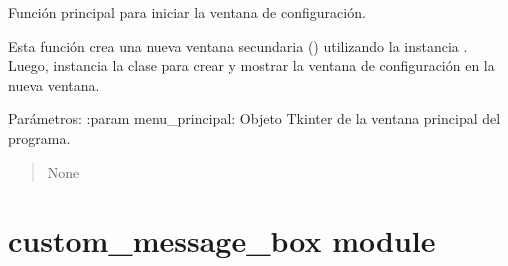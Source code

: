 \documentclass[letterpaper,10pt,spanish]{sphinxmanual}
\begin{document}

\begin{fulllineitems}
\label{\detokenize{configuracion:configuracion.main}}
\pysigstartsignatures
{}
\pysigstopsignatures
\sphinxAtStartPar
Función principal para iniciar la ventana de configuración.

\sphinxAtStartPar
Esta función crea una nueva ventana secundaria () utilizando
la instancia . Luego, instancia la clase 
para crear y mostrar la ventana de configuración en la nueva ventana.

\sphinxAtStartPar
Parámetros:
:param menu\_principal: Objeto Tkinter de la ventana principal del programa.
\begin{quote}\begin{description}
\sphinxAtStartPar
None

\end{description}\end{quote}

\end{fulllineitems}


\sphinxstepscope


\chapter{custom\_message\_box module}
\label{\detokenize{custom_message_box:module-custom_message_box}}\label{\detokenize{custom_message_box:custom-message-box-module}}\label{\detokenize{custom_message_box::doc}}
\end{document}
